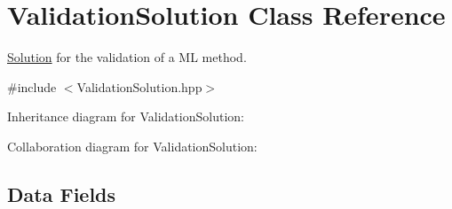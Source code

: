 \hypertarget{class_validation_solution}{}\section{Validation\+Solution Class Reference}
\label{class_validation_solution}


\mbox{\hyperlink{class_solution}{Solution}} for the validation of a ML method.  




{\ttfamily \#include $<$Validation\+Solution.\+hpp$>$}



Inheritance diagram for Validation\+Solution\+:


Collaboration diagram for Validation\+Solution\+:
\subsection*{Data Fields}
